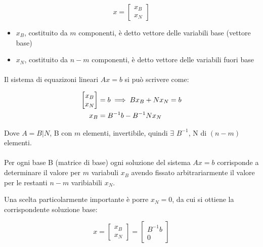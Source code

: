 \documentclass[a4paper, 11pt]{article}
\begin{document}
            \[ x = 
            \begin{bmatrix}
                x_B \\
                x_N
            \end{bmatrix}
            \]

            \begin{itemize}
                \item $x_B$, costituito da $m$ componenti, è detto vettore delle variabili base (vettore base)
                \item $x_N$, costituito da $n-m$ componenti, è detto vettore delle variabili fuori base
            \end{itemize}



            \paragraph{}
            Il sistema di equazizoni lineari $Ax = b$ si può scrivere come:
            
            \begin{align}
                [B|N] 
                \begin{bmatrix}
                    x_B \\
                    x_N 
                \end{bmatrix} &= b
                \implies B x_B + N x_N = b \notag \\
                x_B &= B^{-1} b -B^{-1} N x_N \notag 
            \end{align}

            Dove $A = B|N$, B con $m$ elementi, invertibile, quindi $\exists$ $B^{-1}$, N di $(n-m)$ elementi.
            

            \paragraph{}
            Per ogni base B (matrice di base) ogni soluzione del sistema $Ax = b$ corrisponde a determinare il valore per $m$ variabuli $x_B$ avendo fissato arbitrariarmente il valore per le restanti $n-m$ varibiabili $x_N$.

            Una scelta particolarmente importante è porre $x_N = 0$, da cui si ottiene la corrispondente soluzione base: 
            
            \[ 
                x = 
                \begin{bmatrix}
                    x_B \\
                    x_N
                \end{bmatrix}
                = 
                \begin{bmatrix}
                    B^{-1}b \\
                    0
                \end{bmatrix}
            \]
\end{document}
